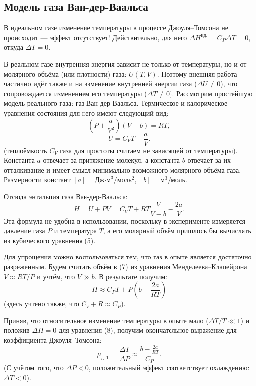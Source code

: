 \documentclass[a4paper]{article}
\begin{document}
	\subsection*{Модель газа Ван-дер-Ваальса}
	
	В идеальном газе изменение температуры в процессе Джоуля--Томсона не происходит --- эффект отсутствует! Действительно, для него $\Delta H^{\text{ид.}} = C_P \Delta T = 0$, откуда $\Delta T = 0$.
	
	В реальном газе внутренняя энергия зависит не только от температуры, но и от молярного объёма (или плотности) газа: $U(T,V)$. Поэтому внешняя работа частично идёт также и на изменение внутренней энергии газа ($\Delta U \neq 0$), что сопровождается изменением его температуры ($\Delta T \neq 0$). Рассмотрим простейшую модель реального газа: газ Ван-дер-Ваальса. Термическое и калорическое уравнения состояния для него имеют следующий вид:
	\begin{equation}
		\left( P + \frac{a}{V^2} \right) (V - b) = RT,
	\end{equation}
	\begin{equation}
		U = C_V T - \frac{a}{V}.
	\end{equation}
	(теплоёмкость $C_V$ газа для простоты считаем не зависящей от температуры). Константа $a$ отвечает за притяжение молекул, а константа $b$ отвечает за их отталкивание и имеет смысл минимально возможного молярного объёма газа. Размерности констант $[a] = \text{Дж·м}^3/\text{моль}^2$, $[b] = \text{м}^3/\text{моль}$.
	
	Отсюда энтальпия газа Ван-дер-Ваальса:
	\begin{equation}
		H = U + PV = C_V T + RT \frac{V}{V-b} - \frac{2a}{V}.
	\end{equation}
	Эта формула не удобна в использовании, поскольку в эксперименте измеряется давление газа $P$ и температура $T$, а его молярный объём пришлось бы вычислять из кубического уравнения (5).
	
	Для упрощения можно воспользоваться тем, что газ в опыте является достаточно разреженным. Будем считать объём в (7) из уравнения Менделеева--Клапейрона $V \approx RT/P$ и учтём, что $V \gg b$. В результате получим:
	\begin{equation}
		H \approx C_P T + P \left( b - \frac{2a}{RT} \right)
	\end{equation}
	(здесь учтено также, что $C_V + R \approx C_P$).
	
	Приняв, что относительное изменение температуры в опыте мало ($\Delta T/T \ll 1$) и положив $\Delta H = 0$ для уравнения (8), получим окончательное выражение для коэффициента Джоуля--Томсона:
	\begin{equation}
		\mu_{\text{д--Т}} = \frac{\Delta T}{\Delta P} \approx \frac{b - \frac{2a}{RT}}{C_P}.
	\end{equation}
	(С учётом того, что $\Delta P < 0$, положительный эффект соответствует охлаждению: $\Delta T < 0$).
	
\end{document}
